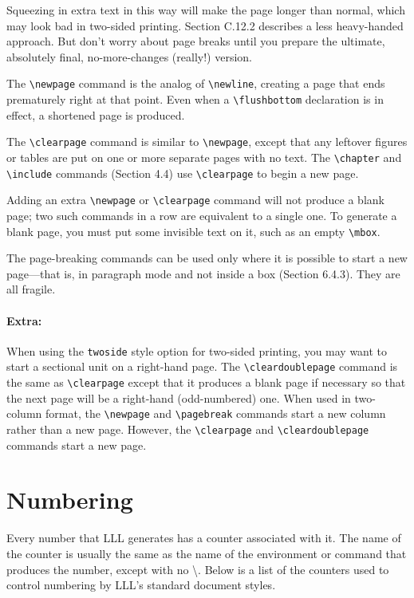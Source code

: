 \documentclass{article}
\newcommand{\justtext}[1]{\texttt{\textbackslash #1}}
\begin{document}
Squeezing in extra text in this way will make the page longer than normal, which may look bad in two-sided printing. Section C.12.2 describes a less heavy-handed approach. But don't worry about page breaks until you prepare the ultimate, absolutely final, no-more-changes (really!) version.

The \justtext{newpage} command is the analog of \justtext{newline}, creating a page that ends prematurely right at that point. Even when a \justtext{flushbottom} declaration is in effect, a shortened page is produced.

The \justtext{clearpage} command is similar to \justtext{newpage}, except that any leftover figures or tables are put on one or more separate pages with no text. The \justtext{chapter} and \justtext{include} commands (Section 4.4) use \justtext{clearpage} to begin a new page.

Adding an extra \justtext{newpage} or \justtext{clearpage} command will not produce a blank page; two such commands in a row are equivalent to a single one. To generate a blank page, you must put some invisible text on it, such as an empty \justtext{mbox}.

The page-breaking commands can be used only where it is possible to start a new page---that is, in paragraph mode and not inside a box (Section 6.4.3). They are all fragile.

\paragraph{Extra:} When using the {\tt twoside} style option for two-sided printing, you may want to start a sectional unit on a right-hand page. The \justtext{cleardoublepage} command is the same as \justtext{clearpage} except that it produces a blank page if necessary so that the next page will be a right-hand (odd-numbered) one. When used in two-column format, the \justtext{newpage} and \justtext{pagebreak} commands start a new column rather than a new page. However, the \justtext{clearpage} and \justtext{cleardoublepage} commands start a new page.


\section{Numbering}

Every number that LLL generates has a counter associated with it. The name of the counter is usually the same as the name of the environment or command that produces the number, except with no \textbackslash. Below is a list of the counters used to control numbering by LLL's standard document styles.
\end{document}
